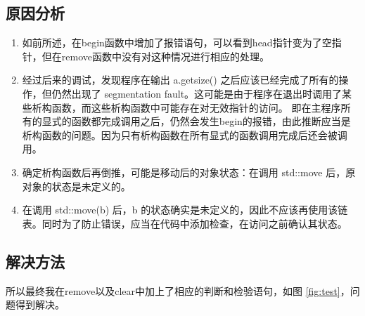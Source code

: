 \documentclass[UTF8]{ctexart}
\begin{document}
\subsection{原因分析}
\begin{enumerate}
    \item 如前所述，在begin函数中增加了报错语句，可以看到head指针变为了空指针，但在remove函数中没有对这种情况进行相应的处理。
    \item 经过后来的调试，发现程序在输出 a.getsize() 之后应该已经完成了所有的操作，但仍然出现了 segmentation fault。这可能是由于程序在退出时调用了某些析构函数，而这些析构函数中可能存在对无效指针的访问。
    即在主程序所有的显式的函数都完成调用之后，仍然会发生begin的报错，由此推断应当是析构函数的问题。因为只有析构函数在所有显式的函数调用完成后还会被调用。
    \item 确定析构函数后再倒推，可能是移动后的对象状态：在调用 std::move 后，原对象的状态是未定义的。
    \item 在调用 std::move(b) 后，b 的状态确实是未定义的，因此不应该再使用该链表。同时为了防止错误，应当在代码中添加检查，在访问之前确认其状态。
\end{enumerate}
\subsection{解决方法}
    所以最终我在remove以及clear中加上了相应的判断和检验语句，如图 \ref{fig:test}，问题得到解决。
\end{document}
